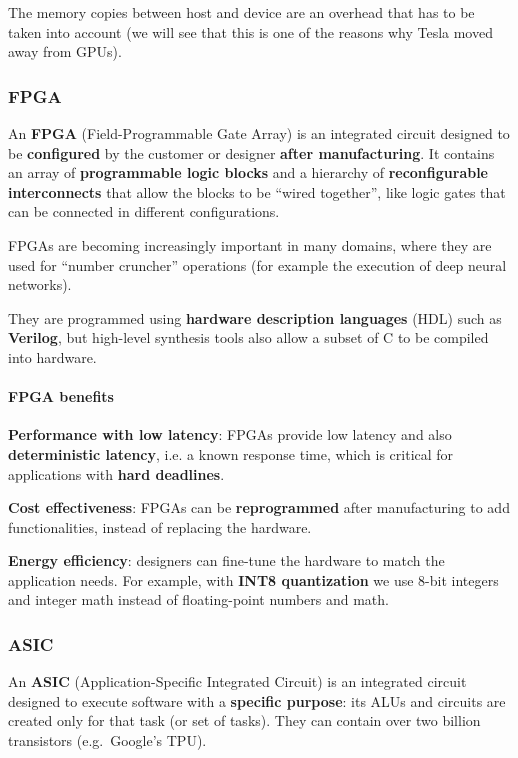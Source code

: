The memory copies between host and device are an overhead that has to be taken into account (we will see that this is one of the reasons why Tesla moved away from GPUs).

\subsubsection{FPGA}
An \textbf{FPGA} (Field-Programmable Gate Array) is an integrated circuit designed to be \textbf{configured} by the customer or designer \textbf{after manufacturing}.
It contains an array of \textbf{programmable logic blocks} and a hierarchy of \textbf{reconfigurable interconnects} that allow the blocks to be ``wired together'', like logic gates that can be connected in different configurations.

FPGAs are becoming increasingly important in many domains, where they are used for ``number cruncher'' operations (for example the execution of deep neural networks).

They are programmed using \textbf{hardware description languages} (HDL) such as \textbf{Verilog}, but high-level synthesis tools also allow a subset of C to be compiled into hardware.

\paragraph{FPGA benefits}
\begin{compactitemize}
    \item \textbf{Performance with low latency}: FPGAs provide low latency and also \textbf{deterministic latency}, i.e. a known response time, which is critical for applications with \textbf{hard deadlines}.
    \item \textbf{Cost effectiveness}: FPGAs can be \textbf{reprogrammed} after manufacturing to add functionalities, instead of replacing the hardware.
    \item \textbf{Energy efficiency}: designers can fine-tune the hardware to match the application needs. For example, with \textbf{INT8 quantization} we use 8-bit integers and integer math instead of floating-point numbers and math.
\end{compactitemize}

\subsubsection{ASIC}
An \textbf{ASIC} (Application-Specific Integrated Circuit) is an integrated circuit designed to execute software with a \textbf{specific purpose}: its ALUs and circuits are created only for that task (or set of tasks).
They can contain over two billion transistors (e.g.\ Google's TPU).

